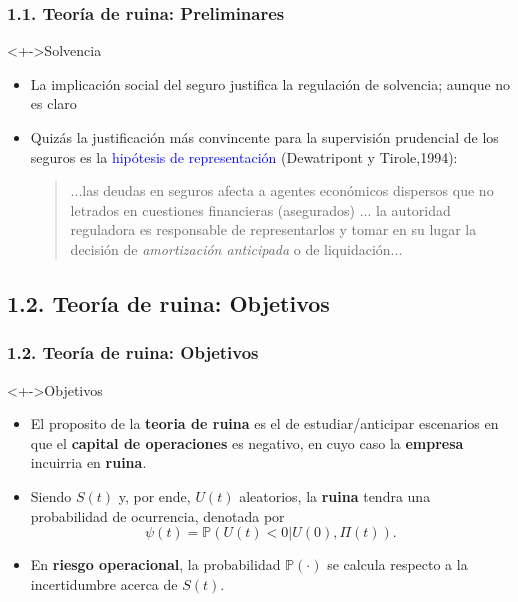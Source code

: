 \documentclass[cjk,t,compress]{beamer}
\begin{document}
\begin{frame}[fragile]
	\frametitle{1.1. Teor\'ia de ruina: Preliminares}
	\scriptsize  	

		\vspace{0.1cm}
		\begin{block}<+->{Solvencia}
		\vspace{0.1cm}
		\begin{itemize}
		  \item %
		  La implicaci\'on social del seguro justifica la regulaci\'on de solvencia; aunque no es claro
		  
		  \item Quiz\'as la justificaci\'on m\'as convincente para la supervisi\'on prudencial de los seguros es la \textcolor{blue}{hip\'otesis de representaci\'on} (Dewatripont y Tirole,1994):
		  \begin{quote}
		  ...las deudas en seguros afecta a agentes econ\'omicos dispersos que no letrados en cuestiones financieras (asegurados) ... la autoridad reguladora es responsable de representarlos y tomar en su lugar la decisi\'on de {\it amortizaci\'on anticipada} o de liquidaci\'on...
		  \end{quote}
		\end{itemize}
		\end{block}
		
\end{frame}


%
%
\subsection{1.2. Teor\'ia de ruina: Objetivos}
\begin{frame}[fragile]
	\frametitle{1.2. Teor\'ia de ruina: Objetivos}
	\scriptsize  	
		
		\vspace{0.1cm}
		\begin{block}<+->{Objetivos}
		\vspace{0.1cm}
		\begin{itemize}
		 \item El proposito de la {\bf teoria de ruina} es el de estudiar/anticipar escenarios en que el {\bf capital de operaciones} es negativo, en cuyo caso la {\bf empresa} incuirria en {\bf ruina}.
		 \item Siendo $S(t)$ y, por ende, $U(t)$ aleatorios, la {\bf ruina} tendra una probabilidad de ocurrencia, denotada por 
			$$
				\psi(t) = \mathbb{P}(U(t)<0|U(0),\Pi(t)).
			$$
		 \item En {\bf riesgo operacional}, la probabilidad $\mathbb{P}(\cdot)$ se calcula respecto a la incertidumbre acerca de $S(t)$.
		\end{itemize}
		\end{block}
		
\end{frame}
\end{document}
